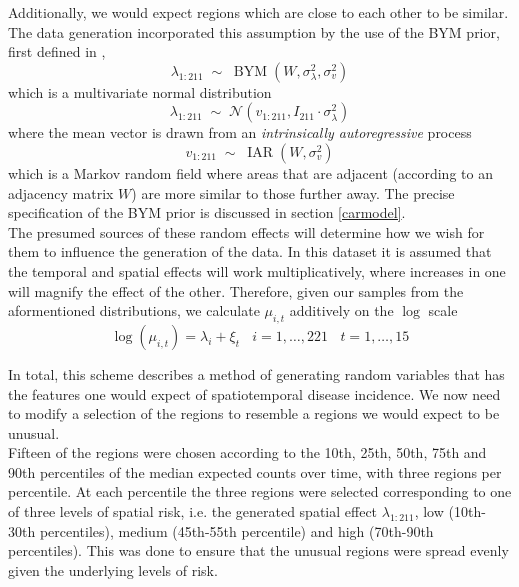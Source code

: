 \documentclass[11pt]{report}
\begin{document}
Additionally, we would expect regions which are close to each other to be similar. The data generation incorporated this assumption by the use of the BYM prior, first defined in \citet{bym},
\begin{equation}
\lambda_{1:211} \; \sim \; \operatorname{BYM}(W, \sigma_{\lambda}^2, \sigma_v^2) 
\end{equation}
which is a multivariate normal distribution
\begin{equation}
\lambda_{1:211} \; \sim \; \mathcal{N}(v_{1:211}, I_{211} \cdot\sigma_{\lambda}^2)
\end{equation} 
where the mean vector is drawn from an \emph{intrinsically autoregressive} process
\begin{equation}
v_{1:211} \; \sim \; \operatorname{IAR}(W, \sigma_v^2)
\end{equation}
which is a Markov random field where areas that are adjacent (according to an adjacency matrix $W$) are more similar to those further away. The precise specification of the BYM prior is discussed in section \ref{carmodel}. \\

The presumed sources of these random effects will determine how we wish for them to influence the generation of the data. In this dataset it is assumed that the temporal and spatial effects will work multiplicatively, where increases in one will magnify the effect of the other. Therefore, given our samples from the aformentioned distributions, we calculate $\mu_{i,t}$ additively on the $\log$ scale
\begin{equation}
\log{(\mu_{i,t})} = \lambda_i + \xi_t \ \ \ \ i=1,\ldots,221 \ \ \ \ t=1,\ldots,15
\end{equation}

In total, this scheme describes a method of generating random variables that has the features one would expect of spatiotemporal disease incidence. We now need to modify a selection of the regions to resemble a regions we would expect to be unusual. \\

Fifteen of the regions were chosen according to the 10th, 25th, 50th, 75th and 90th percentiles of the median expected counts over time, with three regions per percentile. At each percentile the three regions were selected corresponding to one of three levels of spatial risk, i.e. the generated spatial effect $\lambda_{1:211}$, low (10th-30th percentiles), medium (45th-55th percentile) and high (70th-90th percentiles). This was done to ensure that the unusual regions were spread evenly given the underlying levels of risk. \\
\end{document}
